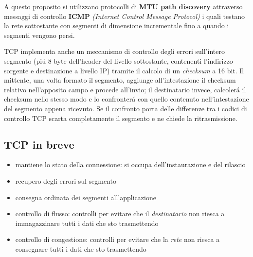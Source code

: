 \documentclass[12pt]{article}
\begin{document}
A questo proposito si utilizzano protocolli di \textbf{MTU path discovery} attraverso messaggi di controllo 
\textbf{ICMP} \textit{(Internet Control Message Protocol)} i quali testano la rete sottostante con segmenti di 
dimensione incrementale fino a quando i segmenti vengono persi.

TCP implementa anche un meccanismo di controllo degli errori sull'intero segmento (pi\'u 8 byte dell'header del 
livello sottostante, contenenti l'indirizzo sorgente e destinazione a livello IP) tramite il 
calcolo di un \textit{checksum} a 16 bit. Il mittente, una volta formato il segmento, aggiunge all'intestazione il 
checksum relativo nell'apposito campo e procede all'invio; il destinatario invece, calcoler\'a il checksum nello 
stesso modo e lo confronter\'a con quello contenuto nell'intestazione del segmento appena ricevuto. Se il confronto 
porta delle differenze tra i codici di controllo TCP scarta completamente il segmento e ne chiede la ritrasmissione.

\subsection{TCP in breve}
\begin{itemize}[noitemsep]
	\item mantiene lo stato della connessione: si occupa dell'instaurazione e del rilascio 
	\item recupero degli errori sul segmento
	\item consegna ordinata dei segmenti all'applicazione
	\item controllo di flusso: controlli per evitare che il \textit{destinatario} non riesca
          a immagazzinare tutti i dati che sto trasmettendo
	\item controllo di congestione: controlli per evitare che la \textit{rete} non riesca a
          consegnare tutti i dati che sto trasmettendo
\end{itemize}

\clearpage
\end{document}

